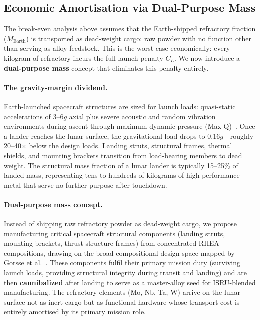 \documentclass[11pt,a4paper]{article}
\begin{document}
\subsection{Economic Amortisation via Dual-Purpose Mass}
\label{subsec:dual_purpose}

The break-even analysis above assumes that the Earth-shipped refractory fraction ($M_{\text{Earth}}$) is transported as dead-weight cargo: raw powder with no function other than serving as alloy feedstock. This is the worst case economically: every kilogram of refractory incurs the full launch penalty $C_L$. We now introduce a \textbf{dual-purpose mass} concept that eliminates this penalty entirely.

\paragraph{The gravity-margin dividend.}
Earth-launched spacecraft structures are sized for launch loads: quasi-static accelerations of 3--6$g$ axial plus severe acoustic and random vibration environments during ascent through maximum dynamic pressure (Max-Q)~\cite{Sarafin1995}. Once a lander reaches the lunar surface, the gravitational load drops to 0.16$g$---roughly 20--40$\times$ below the design loads. Landing struts, structural frames, thermal shields, and mounting brackets transition from load-bearing members to dead weight. The structural mass fraction of a lunar lander is typically 15--25\% of landed mass, representing tens to hundreds of kilograms of high-performance metal that serve no further purpose after touchdown.

\paragraph{Dual-purpose mass concept.}
Instead of shipping raw refractory powder as dead-weight cargo, we propose manufacturing critical spacecraft structural components (landing struts, mounting brackets, thrust-structure frames) from concentrated RHEA compositions, drawing on the broad compositional design space mapped by Gorsse et al.~\cite{Gorsse2017}. These components fulfil their primary mission duty (surviving launch loads, providing structural integrity during transit and landing) and are then \textbf{cannibalized} after landing to serve as a master-alloy seed for ISRU-blended manufacturing. The refractory elements (Mo, Nb, Ta, W) arrive on the lunar surface not as inert cargo but as functional hardware whose transport cost is entirely amortised by its primary mission role.
\end{document}
